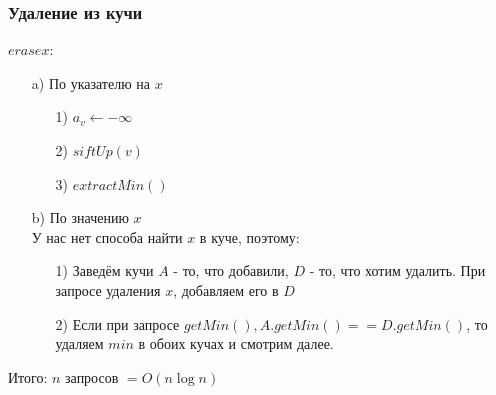 \subsubsection{Удаление из кучи}
$erase x$:
\begin{itemize}
  \item [a)] По указателю на $x$
    \begin{itemize}
      \item [1) ] $a_v \leftarrow -\infty$
      \item [2) ] $siftUp(v)$
      \item [3) ] $extractMin()$
    \end{itemize}
  \item [b)] По значению $x$ \\
    У нас нет способа найти $x$ в куче, поэтому:
    \begin{itemize}
      \item [1) ] Заведём кучи $A$ - то, что добавили, $D$ - то, что хотим удалить. При запросе удаления $x$, добавляем его в $D$
      \item [2)] Если при запросе $getMin(), A.getMin() == D.getMin()$, то удаляем $min$ в обоих кучах и смотрим далее.
    \end{itemize}
\end{itemize}
Итого: $n$ запросов $= O(n\log n)$
